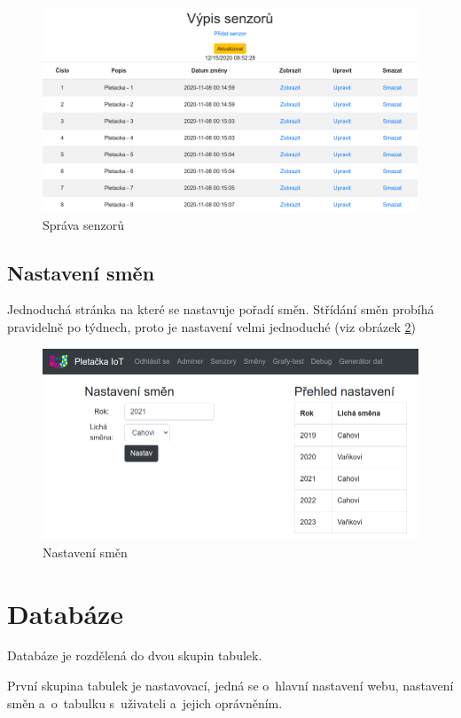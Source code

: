 \begin{figure}[htbp]
    \centering
    \includegraphics[width=\textwidth]{img/Edit.png}
    \caption{Správa senzorů}
    \label{fig:webSpravaSenzoru}
\end{figure}

\subsection{Nastavení směn}
Jednoduchá stránka na které se nastavuje pořadí směn.
Střídání směn probíhá pravidelně po týdnech, proto je nastavení velmi jednoduché (viz obrázek \ref{fig:webSmeny})

\begin{figure}[htbp]
    \centering
    \includegraphics[width=\textwidth]{img/smeny.png}
    \caption{Nastavení směn}
    \label{fig:webSmeny}
\end{figure}

\section{Databáze}
Databáze je rozdělená do dvou skupin tabulek.

První skupina tabulek je nastavovací, jedná se o~hlavní nastavení webu, nastavení směn a~o~tabulku s~uživateli a~jejich oprávněním.

